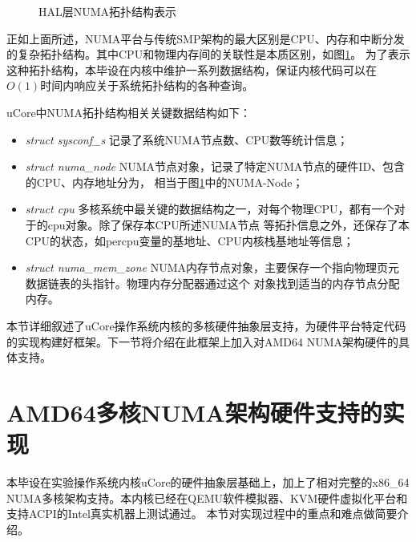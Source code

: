 \begin{figure}[ht]
\caption{HAL层NUMA拓扑结构表示}
\label{fig:numa-node}
\end{figure}

正如上面所述，NUMA平台与传统SMP架构的最大区别是CPU、内存和中断分发的复杂拓扑结构。其中CPU和物理内存间的关联性是本质区别，如图\ref{fig:numa-node}。
为了表示这种拓扑结构，本毕设在内核中维护一系列数据结构，保证内核代码可以在$O(1)$时间内响应关于系统拓扑结构的各种查询。

uCore中NUMA拓扑结构相关关键数据结构如下：
\begin{itemize}
\item \emph{struct sysconf\_s}  \pozhehao 记录了系统NUMA节点数、CPU数等统计信息；
\item \emph{struct numa\_node} \pozhehao NUMA节点对象，记录了特定NUMA节点的硬件ID、包含的CPU、内存地址分为，
	相当于图\ref{fig:numa-node}中的NUMA-Node；
\item \emph{struct cpu} \pozhehao 多核系统中最关键的数据结构之一，对每个物理CPU，都有一个对于的cpu对象。除了保存本CPU所述NUMA节点
等拓扑信息之外，还保存了本CPU的状态，如percpu变量的基地址、CPU内核栈基地址等信息；
\item \emph{struct numa\_mem\_zone} \pozhehao NUMA内存节点对象，主要保存一个指向物理页元数据链表的头指针。物理内存分配器通过这个
对象找到适当的内存节点分配内存。
\end{itemize}

本节详细叙述了uCore操作系统内核的多核硬件抽象层支持，为硬件平台特定代码的实现构建好框架。下一节将介绍在此框架上加入对AMD64 NUMA架构硬件的具体支持。


\section{AMD64多核NUMA架构硬件支持的实现}
本毕设在实验操作系统内核uCore的硬件抽象层基础上，加上了相对完整的x86\_64
NUMA多核架构支持。本内核已经在QEMU软件模拟器、KVM硬件虚拟化平台和支持ACPI的Intel真实机器上测试通过。
本节对实现过程中的重点和难点做简要介绍。


